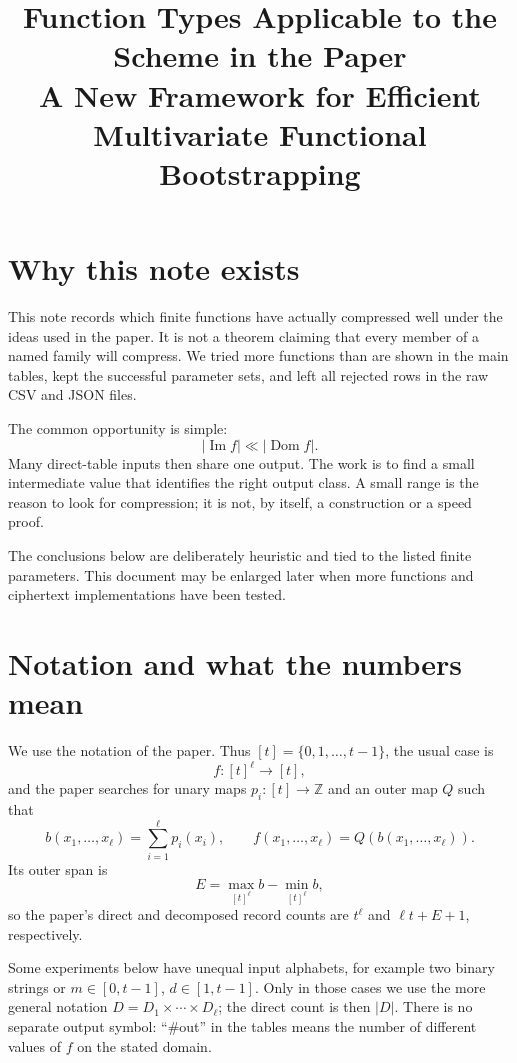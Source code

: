 \documentclass[10pt]{article}
\title{Function Types Applicable to the Scheme in the Paper\\
A New Framework for Efficient Multivariate Functional Bootstrapping}
\author{}
\date{}
\newcommand{\card}[1]{\lvert#1\rvert}
\newcommand{\Z}{\mathbb Z}
\begin{document}
\maketitle

\section{Why this note exists}

This note records which finite functions have actually compressed well under the
ideas used in the paper.  It is not a theorem claiming that every member of a
named family will compress.  We tried more functions than are shown in the main
tables, kept the successful parameter sets, and left all rejected rows in the raw
CSV and JSON files.

The common opportunity is simple:
\[
  \card{\operatorname{Im}f}\ll \card{\operatorname{Dom}f}.
\]
Many direct-table inputs then share one output.  The work is to find a small
intermediate value that identifies the right output class.  A small range is the
reason to look for compression; it is not, by itself, a construction or a speed
proof.

The conclusions below are deliberately heuristic and tied to the listed finite
parameters.  This document may be enlarged later when more functions and
ciphertext implementations have been tested.

\section{Notation and what the numbers mean}

We use the notation of the paper.  Thus
\([t]=\{0,1,\ldots,t-1\}\), the usual case is
\[
  f:[t]^\ell\longrightarrow[t],
\]
and the paper searches for unary maps \(p_i:[t]\to\Z\) and an outer map
\(Q\) such that
\[
  b(x_1,\ldots,x_\ell)=\sum_{i=1}^{\ell}p_i(x_i),
  \qquad f(x_1,\ldots,x_\ell)=Q(b(x_1,\ldots,x_\ell)).
\]
Its outer span is
\[
  E=\max_{[t]^\ell}b-\min_{[t]^\ell}b,
\]
so the paper's direct and decomposed record counts are \(t^\ell\) and
\(\ell t+E+1\), respectively.

Some experiments below have unequal input alphabets, for example two binary
strings or \(m\in[0,t-1]\), \(d\in[1,t-1]\).  Only in those cases we use the
more general notation
\(D=D_1\times\cdots\times D_\ell\); the direct count is then \(\card D\).
There is no separate output symbol: ``\#out'' in the tables means the number
of different values of \(f\) on the stated domain.
\end{document}
